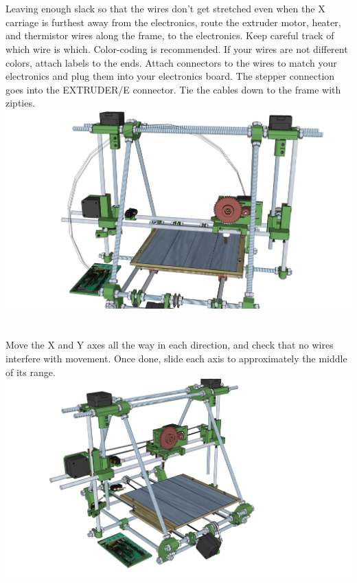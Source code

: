 \documentclass[twoside,a4paper,titlepage]{memoir}
\begin{document}
	\section{}
	Leaving enough slack so that the wires don't get stretched even when the X carriage is furthest away
	from the electronics, route the extruder motor, heater, and thermistor wires along the frame, to the
	electronics. Keep careful track of which wire is which. Color-coding is recommended. If your wires are
	not different colors, attach labels to the ends. Attach connectors to the wires to match your electronics
	and plug them into your electronics board. The stepper connection goes into the EXTRUDER/E
	connector. Tie the cables down to the frame with zipties.\\
	\includegraphics[width=1\linewidth]{graphics/ch10_16.png}
	
	\section{}
	Move the X and Y axes all the way in each direction, and check that no wires interfere with movement.
	Once done, slide each axis to approximately the middle of its range.\\
	\includegraphics[width=1\linewidth]{graphics/ch10_17.png}
	
\end{document}
